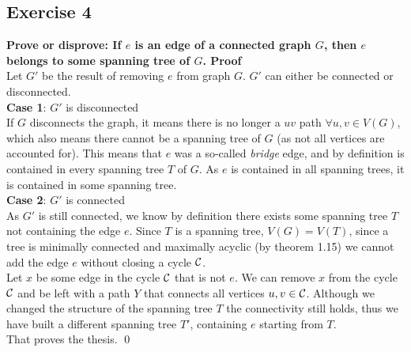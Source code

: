 \subsection*{Exercise 4}
\boldmath
\textbf{Prove or disprove: If $e$ is an edge of a connected graph $G$, then $e$ belongs to some spanning tree of $G$.\spacer 
Proof} \\
\unboldmath
Let $G'$ be the result of removing $e$ from graph $G$. $G'$ can either be connected or disconnected. \\
\linebreak
\textbf{Case 1}: $G'$ is disconnected \\
If $G$ disconnects the graph, it means there is no longer a $uv$ path $\forall u,v \in V(G)$, which also means there cannot be a spanning tree of $G$ (as not all vertices are accounted for). This means that $e$ was a so-called \textit{bridge} edge, and by definition is contained in every spanning tree $T$ of $G$. As $e$ is contained in all spanning trees, it is contained in some spanning tree. \\
\linebreak 
\textbf{Case 2}: $G'$ is connected \\
As $G'$ is still connected, we know by definition there exists some spanning tree $T$ not containing the edge $e$. Since $T$ is a spanning tree, $V(G) = V(T)$, since a tree is minimally connected and maximally acyclic (by theorem 1.15) we cannot add the edge $e$ without closing a cycle $\mathcal{C}$. \\
\linebreak 
Let $x$ be some edge in the cycle $\mathcal{C}$ that is not $e$. We can remove $x$ from the cycle $\mathcal{C}$ and be left with a path $Y$ that connects all vertices $u, v \in \mathcal{C}$. Although we changed the structure of the spanning tree $T$ the connectivity still holds, thus we have built a different spanning tree $T'$, containing $e$ starting from $T$. \\
\linebreak
That proves the thesis. \qed
